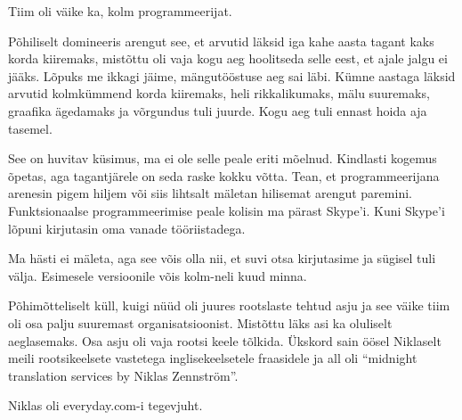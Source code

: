 
Tiim oli väike ka, kolm programmeerijat. 


Põhiliselt domineeris arengut see, et arvutid läksid iga 
kahe aasta tagant kaks korda kiiremaks, mistõttu oli vaja kogu aeg hoolitseda 
selle eest, et ajale jalgu ei jääks. Lõpuks me ikkagi jäime, mängutööstuse aeg 
sai läbi. Kümne aastaga läksid arvutid kolmkümmend korda kiiremaks, heli rikkalikumaks, 
mälu suuremaks, graafika ägedamaks ja võrgundus tuli juurde. Kogu aeg tuli 
ennast hoida aja tasemel. 


See on huvitav küsimus, ma ei ole selle peale eriti mõelnud. Kindlasti 
kogemus õpetas, aga tagantjärele on seda raske kokku võtta. 
Tean, et programmeerijana arenesin pigem hiljem või siis lihtsalt mäletan hilisemat arengut paremini. 
Funktsionaalse programmeerimise peale kolisin ma pärast Skype'i. Kuni Skype'i 
lõpuni kirjutasin oma vanade tööriistadega.


Ma hästi ei mäleta, aga see võis olla nii, et suvi otsa kirjutasime ja 
sügisel tuli välja. Esimesele versioonile võis kolm-neli 
kuud minna.


Põhimõtteliselt küll, kuigi nüüd oli juures rootslaste 
tehtud asju ja see väike tiim oli osa palju suuremast organisatsioonist. 
Mistõttu läks asi ka oluliselt aeglasemaks. Osa asju oli vaja rootsi keele 
tõlkida. Ükskord sain öösel Niklaselt meili 
rootsikeelsete vastetega inglisekeelsetele fraasidele ja all oli 
\enquote{midnight translation services by Niklas Zennström}.


Niklas oli everyday.com-i tegevjuht. 



